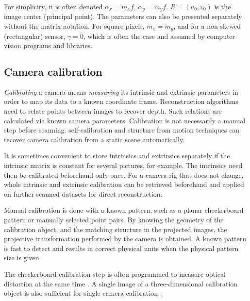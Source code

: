 For simplicity, it is often denoted $\alpha_x = m_x f$, $\alpha_y = m_y f$.
$R = (u_0, v_0)$ is the image center (principal point).
The parameters can also be presented separately without the matrix notation.
For square pixels, $m_x = m_y$, and for a non-skewed (rectangular) sensor, $\gamma = 0$, which is often the case and assumed by computer vision programs and libraries. \cite{hartley03multiview,szeliski10vision,heyden2005multiple}



\subsection{Camera calibration} %

\emph{Calibrating} a camera means \emph{measuring} its intrinsic and extrinsic parameters in order to map its data to a known coordinate frame.
Reconstruction algorithms need to relate points between images to recover depth.
Such relations are calculated via known camera parameters.
Calibration is not necessarily a manual step before scanning.
self-calibration and structure from motion techniques can recover camera calibration from a static scene automatically. \cite{pollefeys1999hand,hartley03multiview}

It is sometimes convenient to store intrinsics and extrinsics separately if the intrinsic matrix is constant for several pictures, for example.
The intrinsics need then be calibrated beforehand only once.
For a camera rig that does not change, whole intrinsic and extrinsic calibration can be retrieved beforehand and applied on further scanned datasets for direct reconstruction.

Manual calibration is done with a known pattern, such as a planar checkerboard pattern \cite{chuang2002performance,zhang2000flexible} or manually selected point pairs.
By knowing the geometry of the calibration object, and the matching structure in the projected images, the projective transformation performed by the camera is obtained.
A known pattern is fast to detect and results in correct physical units when the physical pattern size is given.

The checkerboard calibration step is often programmed to measure optical distortion at the same time \cite{opencv,camcalmatlab}.
A single image of a three-dimensional calibration object is also sufficient for single-camera calibration \cite[p. 181]{hartley03multiview}.


